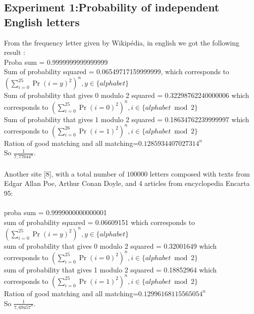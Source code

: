 \documentclass{article}
\begin{document}
\subsection*{Experiment 1:Probability of independent English letters}
From the frequency letter given by Wikip\'edia, in english we got the following result :\\
Proba sum = 0.9999999999999999
\\
Sum of probability squared = 0.06549717159999999, which corresponds to $(\sum_{i=0}^{25}{\Pr(i=y)^2})^n, y \in \{alphabet\} $\\
Sum of probability that gives 0 modulo 2 squared  = 0.32298762240000006 which corresponds to $(\sum_{i=0}^{25}{\Pr(i=0)^2})^n, i \in \{alphabet \bmod 2\} $\\
Sum of probability that gives 1 modulo 2 squared = 0.18634762239999997 which corresponds to $(\sum_{i=0}^{26}{\Pr(i=1)^2})^n, i \in \{alphabet \bmod 2\} $\\
Ration of good matching and all matching=$0.1285934407027314^n$\\
So $\frac{1}{7,77644^n}$.
\\
\\
Another site [8], with a total number of $100000$ letters composed with texts from Edgar Allan Poe, Arthur Conan Doyle, and 4 articles from encyclopedia Encarta 95:\\
\\
proba sum = 0.9999000000000001\\
sum of probability squared = 0.06609151 which corresponds to $(\sum_{i=0}^{25}{\Pr(i=y)^2})^n, y \in \{alphabet\} $\\
sum of probability that gives 0 modulo 2 squared = 0.32001649 which corresponds to $(\sum_{i=0}^{25}{\Pr(i=0)^2})^n, i \in \{alphabet \bmod 2\} $\\
sum of probability that gives 1 modulo 2 squared = 0.18852964 which corresponds to $(\sum_{i=0}^{25}{\Pr(i=1)^2})^n, i \in \{alphabet \bmod 2\} $\\
Ration of good matching and all matching=$0.12996168115565054^n$\\
So $\frac{1}{7,69457^n}$.
\end{document}

